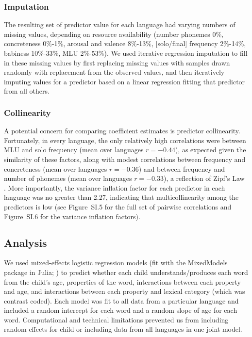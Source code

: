 \documentclass[manuscript]{stjour}
\begin{document}
\subsubsection{Imputation}

The resulting set of predictor value for each language had varying
numbers of missing values, depending on resource availability (number
phonemes 0\%, concreteness 0\%-1\%, arousal and valence 8\%-13\%,
{[}solo/final{]} frequency 2\%-14\%, babiness 10\%-33\%, MLU 2\%-53\%).
We used iterative regression imputation to fill in these missing values
by first replacing missing values with samples drawn randomly with
replacement from the observed values, and then iteratively imputing
values for a predictor based on a linear regression fitting that
predictor from all others.

\subsubsection{Collinearity}

A potential concern for comparing coefficient estimates is predictor
collinearity. Fortunately, in every language, the only relatively high
correlations were between MLU and solo frequency (mean over languages
\(r = -0.44\)), as expected given the similarity of these factors, along
with modest correlations between frequency and concreteness (mean over
languages \(r = -0.36\)) and between frequency and number of phonemes
(mean over languages \(r = -0.33\)), a reflection of Zipf's Law
\citep{zipf1935}. More importantly, the variance inflation factor for
each predictor in each language was no greater than 2.27, indicating
that multicollinearity among the predictors is low (see
Figure~SI.5 for the full set of pairwise
correlations and Figure~SI.6 for the variance inflation
factors).

\subsection{Analysis}

We used mixed-effects logistic regression models (fit with the
MixedModels package in Julia; \citealp{bates2018}) to predict whether
each child understands/produces each word from the child's age,
properties of the word, interactions between each property and age, and
interactions between each property and lexical category (which was
contrast coded). Each model was fit to all data from a particular
language and included a random intercept for each word and a random
slope of age for each word. Computational and technical limitations
prevented us from including random effects for child or including data
from all languages in one joint model.
\end{document}
